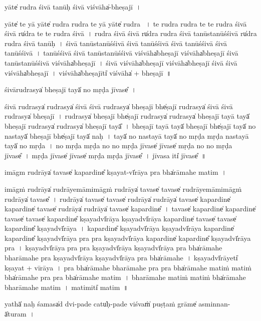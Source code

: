 \documentclass[parskip, DIV=14]{scrartcl}
\begin{document}
{yāte̍ rudra śi॒vā ta॒nūḥ śi॒vā vi॒śvāha̍-bheṣajī~।

yāte̍ te॒ yā yāte̍ rudra rudra te॒ yā yāte̍ rudra ~।
te॒ ru॒dra॒ ru॒dra॒ te॒ te॒ ru॒dra॒ śi॒vā śi॒vā ru̍dra te te rudra śi॒vā~। 
ru॒dra॒ śi॒vā śi॒vā ru̍dra rudra śi॒vā ta॒nūsta॒nūśśi॒vā ru̍dra rudra śi॒vā ta॒nūḥ~।
śi॒vā ta॒nūsta॒nūśśi॒vā śi॒vā ta॒nūśśi॒vā śi॒vā ta॒nūśśi॒vā śi॒vā ta॒nūśśi॒vā~।
ta॒nūśśi॒vā śi॒vā  ta॒nūsta॒nūśśi॒vā vi॒śvāha̍bheṣajī vi॒śvāha̍bheṣajī śi॒vā  ta॒nūsta॒nūśśi॒vā vi॒śvāha̍bheṣajī~।
śi॒vā vi॒śvāha̍bheṣajī vi॒śvāha̍bheṣajī śi॒vā śi॒vā vi॒śvāha̍bheṣajī~।
vi॒śvāha̍bheṣa॒jīti̍ vi॒śvāha̍ + bhe॒ṣa॒jī॒~॥ %

śi॒vāru॒drasya̍ bheṣa॒jī tayā̍ no mṛḍa jī॒vase̎~।

śi॒vā ru॒drasya̍ ru॒drasya̍ śi॒vā śi॒vā ru॒drasya̍ bheṣa॒jī bhe̍ṣa॒jī ru॒drasya̍ śi॒vā śi॒vā ru॒drasya̍ bheṣa॒jī~।
ru॒drasya̍ bheṣa॒jī bhe̍ṣa॒jī ru॒drasya̍ ru॒drasya̍ bheṣa॒jī tayā॒ tayā̍ bheṣa॒jī ru॒drasya̍ ru॒drasya̍ bheṣa॒jī tayā̎~।
bhe॒ṣa॒jī tayā॒ tayā̍ bheṣa॒jī bhe̍ṣa॒jī tayā̍ no na॒stayā̍ bheṣa॒jī bhe̍ṣa॒jī tayā̍ naḥ~।
tayā̍ no na॒stayā॒ tayā̍ no mṛḍa mṛḍa na॒stayā॒ tayā̍ no mṛḍa~।  
no॒ mṛ॒ḍa॒ mṛ॒ḍa॒ no॒ no॒ mṛ॒ḍa॒ jī॒vase̍ jī॒vase̍ mṛḍa no no mṛḍa jī॒vase̎~।
mṛ॒ḍa॒ jī॒vase̍ jī॒vase̍ mṛḍa mṛḍa jī॒vase̎~।
jī॒vasa॒ iti̍ jī॒vase̎~॥ 

i॒māgm ru॒drāya̍ ta॒vase̍ kapa॒rdine̎ kṣa॒yat-vī̍rāya॒ pra bha̍rāmahe ma॒tim~।

i॒māgṁ ru॒drāya̍ ru॒drāye॒māmi॒māgṁ ru॒drāya̍ ta॒vase̍ ta॒vase̍ ru॒drāye॒māmi॒māgṁ ru॒drāya̍ ta॒vase̎~। %
ru॒drāya̍ ta॒vase̍ ta॒vase̍ ru॒drāya̍ ru॒drāya̍ ta॒vase̍ kapa॒rdine̍ kapa॒rdine̍ ta॒vase̍ ru॒drāya̍ ru॒drāya̍ ta॒vase̍ kapa॒rdine̎~।
ta॒vase̍ kapa॒rdine̍ kapa॒rdine̍ ta॒vase̍ ta॒vase̍ kapa॒rdine̎ kṣa॒yadvī̍rāya kṣa॒yadvī̍rāya kapa॒rdine̍ ta॒vase̍ ta॒vase̍ kapa॒rdine̎ kṣa॒yadvī̍rāya~।
ka॒pa॒rdine̎ kṣa॒yadvī̍rāya kṣa॒yadvī̍rāya kapa॒rdine̍ kapa॒rdine̎ kṣa॒yadvī̍rāya॒ pra pra kṣa॒yadvī̍rāya kapa॒rdine̍ kapa॒rdine̎ kṣa॒yadvī̍rāya॒ pra~।
kṣa॒yadvī̍rāya॒ pra pra kṣa॒yadvī̍rāya kṣa॒yadvī̍rāya॒ pra bha̍rāmahe bharāmahe॒ pra kṣa॒yadvī̍rāya kṣa॒yadvī̍rāya॒ pra bha̍rāmahe~।
kṣa॒yadvī̍rā॒yeti̍ kṣa॒yat + vī॒rā॒ya॒~।
pra bha̍rāmahe bharāmahe॒ pra pra bha̍rāmahe ma॒tiṁ ma॒tiṁ bha̍rāmahe॒ pra pra bha̍rāmahe ma॒tim~।
bha॒rā॒ma॒he॒ ma॒tiṁ ma॒tiṁ bha̍rāmahe bharāmahe ma॒tim~।
ma॒timiti̍ ma॒tim~॥ 

yathā̍ na॒ḥ śamasa̍d dvi॒-pade॒ catu̍ḥ-pade॒ viśvaṁ̍ pu॒ṣṭaṁ grāme̍ a॒sminnan-ā̍turam~।

}
\end{document}
